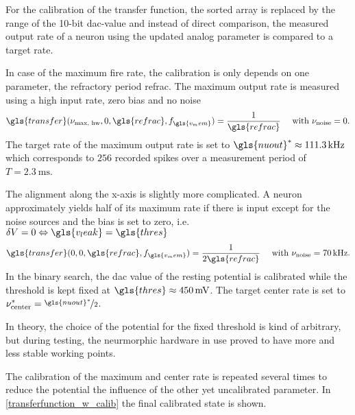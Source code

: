 For the calibration of the transfer function, the sorted array is replaced by the range of the 10-bit \gls{dac}-value and instead of direct comparison, the measured output rate of a neuron using the updated analog parameter is compared to a target rate.

In case of the maximum fire rate, the calibration is only depends on one parameter, the refractory period \gls{refrac}. The maximum output rate is measured using a high input rate, zero bias and no noise
\begin{equation}
\gls{transfer}(\nu_\text{max, hw}, 0, \gls{refrac}, f_{\gls{v_mem}}) = \frac{1}{\gls{refrac}} \quad \text{ with } \nu_\text{noise} = 0.
\end{equation}
The target rate of the maximum output rate is set to $\gls{nuout}^* \approx \SI{111.3}{\kilo \Hz}$ which corresponds to $256$ recorded spikes over a measurement period of $T=\SI{2.3}{\milli \s}$.

The alignment along the x-axis is slightly more complicated. A neuron approximately yields half of its maximum rate if there is input except for the noise sources and the bias is set to zero, i.e. $\delta V = 0 \Leftrightarrow \gls{v_leak} = \gls{thres}$
\begin{equation}
	\gls{transfer}(0, 0, \gls{refrac}, f_{\gls{v_mem}}) = \frac{1}{2\gls{refrac}} \quad \text{ with } \nu_\text{noise} = \SI{70}{kHz}.
\end{equation}
In the binary search, the \gls{dac} value of the resting potential is calibrated while the threshold is kept fixed at $\gls{thres} \approx \SI{450}{\milli \V}$. The target center rate is set to $\nu_\text{center}^* = \nicefrac{\gls{nuout}^*}{2}$.

In theory, the choice of the potential for the fixed threshold is kind of arbitrary, but during testing, the neurmorphic hardware in use proved to have more and less stable working points. 

The calibration of the maximum and center rate is repeated several times to reduce the potential the influence of the other yet uncalibrated parameter. In \cref{transferfunction_w_calib} the final calibrated state is shown. 



